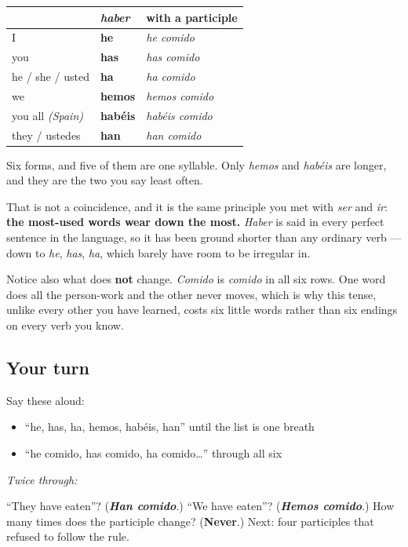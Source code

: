 \begin{grammarlens}[title={Grammar Lens: the whole of it}]
\noindent
\begin{tabularx}{\linewidth}{@{}>{\raggedright\arraybackslash}X>{\raggedright\arraybackslash}X>{\raggedright\arraybackslash}X@{}}
\toprule
\textbf{} & \textbf{\emph{haber}} & \textbf{with a participle} \\
\midrule
I & \textbf{he} & \emph{he comido} \\
you & \textbf{has} & \emph{has comido} \\
he / she / usted & \textbf{ha} & \emph{ha comido} \\
we & \textbf{hemos} & \emph{hemos comido} \\
you all \emph{(Spain)} & \textbf{habéis} & \emph{habéis comido} \\
they / ustedes & \textbf{han} & \emph{han comido} \\
\bottomrule
\end{tabularx}

Six forms, and five of them are one syllable. Only \emph{hemos} and \emph{habéis} are longer, and they are the two you say least often.

That is not a coincidence, and it is the same principle you met with \emph{ser} and \emph{ir}: \textbf{the most-used words wear down the most.} \emph{Haber} is said in every perfect sentence in the language, so it has been ground shorter than any ordinary verb — down to \emph{he}, \emph{has}, \emph{ha}, which barely have room to be irregular in.

Notice also what does \textbf{not} change. \emph{Comido} is \emph{comido} in all six rows. One word does all the person-work and the other never moves, which is why this tense, unlike every other you have learned, costs six little words rather than six endings on every verb you know.
\end{grammarlens}

\subsection*{Your turn}
Say these aloud:

\begin{itemize}
\raggedright
  \item \textquotedblleft{}he, has, ha, hemos, habéis, han\textquotedblright{} until the list is one breath
  \item \textquotedblleft{}he comido, has comido, ha comido…\textquotedblright{} through all six
\end{itemize}

\emph{Twice through:}

\begin{tcolorbox}[breakable,colback=teal!4,colframe=teal!35!black,title={Before you move on}]
\textquotedblleft{}They have eaten\textquotedblright{}? (\emph{\textbf{Han comido}}.) \textquotedblleft{}We have eaten\textquotedblright{}? (\emph{\textbf{Hemos comido}}.) How many times does the participle change? (\textbf{Never}.) Next: four participles that refused to follow the rule.
\end{tcolorbox}
